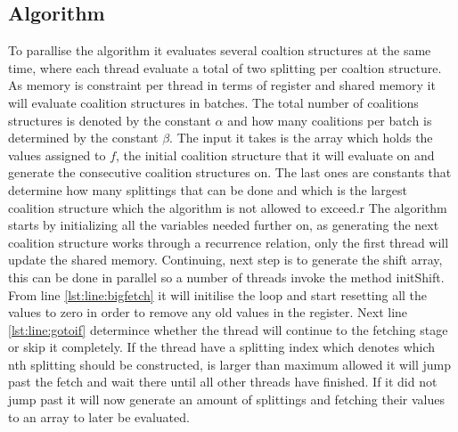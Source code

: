 \documentclass{llncs}
\begin{document}
\subsection{Algorithm}\label{algorithm}
To parallise the algorithm it evaluates several coaltion structures at the same time, where each thread evaluate
a total of two splitting per coaltion structure. As memory is constraint per thread in terms of register and shared memory it will evaluate 
coalition structures in batches. The total number of coalitions structures is denoted by the constant $\alpha$ 
and how many coalitions per batch is determined by the constant $\beta$.
The input it takes is the array which holds the values assigned to $f$, the initial coalition structure that it will evaluate on and generate the
consecutive coalition structures on. The last ones are constants that determine how many splittings that can be done 
and which is the largest coalition structure which the algorithm is not allowed to exceed.r
The algorithm starts by initializing all the variables needed further on,
as generating the next coalition structure works through a recurrence relation, 
only the first thread will update the shared memory. Continuing, next step is to generate the shift array, 
this can be done in parallel so a number of threads invoke the method initShift.
From line \ref{lst:line:bigfetch} it will initilise the loop and start resetting all the values to zero 
in order to remove any old values in the register.
Next line \ref{lst:line:gotoif} determince whether the thread will continue to the fetching stage or skip it completely.
If the thread have a splitting index which denotes which nth splitting should be constructed, 
is larger than maximum allowed it will jump past the fetch and wait there until all other threads have finished.
If it did not jump past it will now generate an amount of splittings and fetching their values to an array to later be evaluated.
\end{document}
